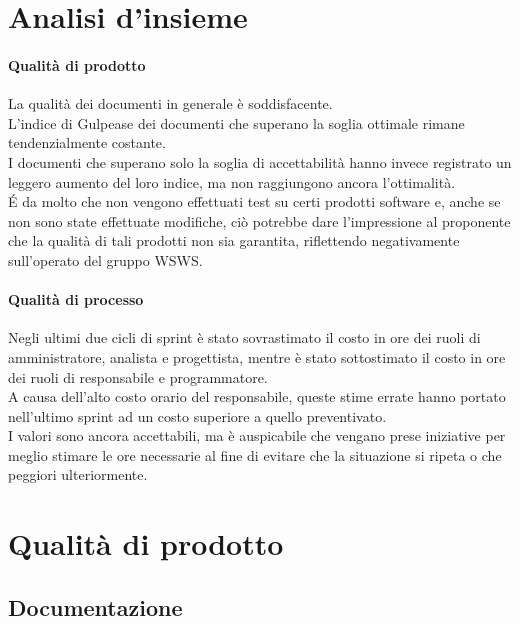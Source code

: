\documentclass[a4paper, 12pt]{article}
\begin{document}
\makefrontpage

\makeversioni

\tableofcontents
\clearpage

\section{Analisi d'insieme}
\paragraph{Qualità di prodotto}
La qualità dei documenti in generale è soddisfacente. \\
L'indice di Gulpease dei documenti che superano la soglia ottimale rimane tendenzialmente costante. \\
I documenti che superano solo la soglia di accettabilità hanno invece registrato un leggero aumento del loro indice, ma non raggiungono ancora l'ottimalità.\\

É da molto che non vengono effettuati test su certi prodotti software e, anche se non sono state effettuate modifiche, ciò potrebbe dare l'impressione al proponente che la qualità di tali prodotti non sia garantita, riflettendo negativamente sull'operato del gruppo WSWS.

\paragraph{Qualità di processo}
Negli ultimi due cicli di sprint è stato sovrastimato il costo in ore dei ruoli di amministratore, analista e progettista, mentre è stato sottostimato il costo in ore dei ruoli di responsabile e programmatore. \\
A causa dell'alto costo orario del responsabile, queste stime errate hanno portato nell'ultimo sprint ad un costo superiore a quello preventivato. \\
I valori sono ancora accettabili, ma è auspicabile che vengano prese iniziative per meglio stimare le ore necessarie al fine di evitare che la situazione si ripeta o che peggiori ulteriormente.

\section{Qualità di prodotto}

\subsection{Documentazione}
\end{document}
